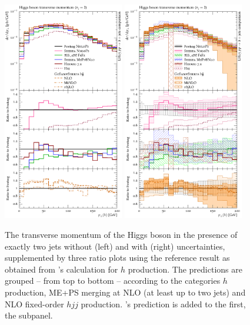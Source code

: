\begin{figure}[t!]
  \centering
  \includegraphics[width=0.47\textwidth]{figures/hjetscomp_u_H_jj_pT_excl.pdf}
  \hfill
  \includegraphics[width=0.47\textwidth]{figures/hjetscomp_H_jj_pT_excl.pdf}
  \caption{\label{fig:hjetscomp:results:2obs:hpt_excl}%
    The transverse momentum of the Higgs boson in the presence of 
    exactly two jets without (left) and with (right) uncertainties,
    supplemented by three ratio plots using the reference result as
    obtained from \Powheg's \NNLOPS calculation for $h$ production.
    The predictions are grouped -- from top to bottom -- according to
    the categories \NNLOPS $h$ production, ME+PS merging at NLO (at
    least up to two jets) and NLO fixed-order $hjj$ production. \Hej's
    prediction is added to the first, the \NNLOPS subpanel.}
\end{figure}


